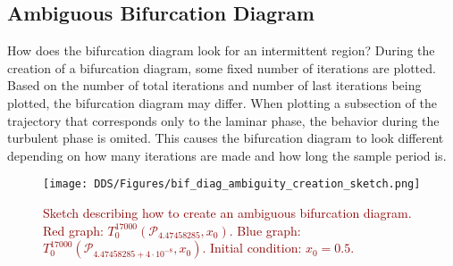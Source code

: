 
\subsection{Ambiguous Bifurcation Diagram}
\label{sec:ambiguous_bif_diag}
How does the bifurcation diagram look for an intermittent region?
During the creation of a bifurcation diagram, some fixed number of iterations are plotted.
Based on the number of total iterations and number of last iterations being plotted, the bifurcation diagram may differ.
When plotting a subsection of the trajectory that corresponds only to the laminar phase, the behavior during the turbulent phase is omited.
This causes the bifurcation diagram to look different depending on how many iterations are made and how long the sample period is.
\par
\begin{figure}[!h]
    \centering
    \texttt{[image: DDS/Figures/bif\_diag\_ambiguity\_creation\_sketch.png]}
    \caption{
        \textcolor{darkred}{
        Sketch describing how to create an ambiguous bifurcation diagram. 
        Red graph: $T^{17000}_{0}(\mathcal{P}_{4.47458285}, x_0)$. 
        Blue graph: $T^{17000}_{0}(\mathcal{P}_{4.47458285+4 \cdot 10^{-8}}, x_0)$. 
        Initial condition: $x_0 = 0.5$.
        }
    }
    \label{fig:ambiguous_bif_diag}
\end{figure}

